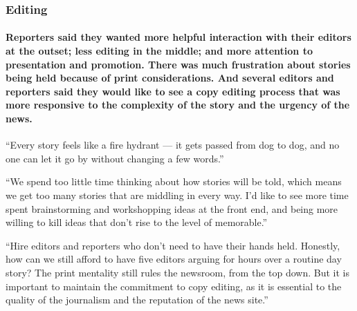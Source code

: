 \hypertarget{editing}{%
\subsubsection{Editing}\label{editing}}

\hypertarget{reporters-said-they-wanted-more-helpful-interaction-with-their-editors-at-the-outset-less-editing-in-the-middle-and-more-attention-to-presentation-and-promotion-there-was-much-frustration-about-stories-being-held-because-of-print-considerations-and-several-editors-and-reporters-said-they-would-like-to-see-a-copy-editing-process-that-was-more-responsive-to-the-complexity-of-the-story-and-the-urgency-of-the-news}{%
\paragraph{Reporters said they wanted more helpful interaction with
their editors at the outset; less editing in the middle; and more
attention to presentation and promotion. There was much frustration
about stories being held because of print considerations. And several
editors and reporters said they would like to see a copy editing process
that was more responsive to the complexity of the story and the urgency
of the
news.}\label{reporters-said-they-wanted-more-helpful-interaction-with-their-editors-at-the-outset-less-editing-in-the-middle-and-more-attention-to-presentation-and-promotion-there-was-much-frustration-about-stories-being-held-because-of-print-considerations-and-several-editors-and-reporters-said-they-would-like-to-see-a-copy-editing-process-that-was-more-responsive-to-the-complexity-of-the-story-and-the-urgency-of-the-news}}

``Every story feels like a fire hydrant --- it gets passed from dog to
dog, and no one can let it go by without changing a few words.''

``We spend too little time thinking about how stories will be told,
which means we get too many stories that are middling in every way. I'd
like to see more time spent brainstorming and workshopping ideas at the
front end, and being more willing to kill ideas that don't rise to the
level of memorable.''

``Hire editors and reporters who don't need to have their hands held.
Honestly, how can we still afford to have five editors arguing for hours
over a routine day story? The print mentality still rules the newsroom,
from the top down. But it is important to maintain the commitment to
copy editing, as it is essential to the quality of the journalism and
the reputation of the news site.''

